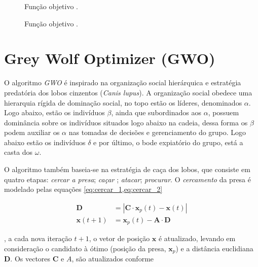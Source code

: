 \documentclass[a4paper, 11pt]{article}
\begin{document}
\begin{figure}[!ht]
    \centering
    \caption{Função objetivo .}
    \label{fig:statistic_sixhump}
    \subfloat[Dispersão.]{%
        \scalebox{.8}{}
    }
    \subfloat[Convergência.]{%
        \scalebox{.8}{}
    }
\end{figure}

\begin{figure}[!ht]
    \centering
    \caption{Função objetivo .}
    \label{fig:statistic_regularized_ts}
    \subfloat[Dispersão]{%
        \scalebox{.8}{}
    }
    \subfloat[Convergência]{%
        \scalebox{.8}{}
    }
\end{figure}

\section{Grey Wolf Optimizer (GWO)}

O algoritmo \textit{GWO} \cite{Mirjalili2014} é inspirado na organização social hierárquica e estratégia predatória dos lobos cinzentos (\textit{Canis lupus}). A organização social obedece uma hierarquia rígida de dominação social, no topo estão os líderes, denominados \( \alpha \). Logo abaixo, estão os indivíduos \( \beta \), ainda que subordinados aos \( \alpha \), possuem dominância sobre os indivíduos situados logo abaixo na cadeia, dessa forma os \( \beta \) podem auxiliar os \( \alpha \) nas tomadas de decisões e gerenciamento do grupo. Logo abaixo estão os indivíduos \( \delta \) e por último, o bode expiatório do grupo, está a casta dos \( \omega \). 

O algoritmo também baseia-se na estratégia de caça dos lobos, que consiste em quatro etapas: \textit{cercar a presa}; \textit{caçar} ; \textit{atacar}; \textit{procurar}. O \textit{cercamento} da presa é modelado pelas equações \ref{eq:cercar_1,eq:cercar_2}

\begin{align}
\label{eq:cercar_1}
\mathbf{D} &=\left|\mathbf{C} \cdot \mathbf{x}_p(t)-\mathbf{x}(t)\right| \\
\label{eq:cercar_2}
\mathbf{x}(t+1) &=\mathbf{x}_p(t)-\mathbf{A} \cdot \mathbf{D} 
\end{align}

, a cada nova iteração \( t+1\), o vetor de posição \( \mathbf{x} \) é atualizado, levando em consideração o candidato à ótimo (posição da presa, \( \mathbf{x}_p\)) e a distância euclidiana \( \mathbf{D}\). Os vectores \( \mathbf{C}\) e \( A\), são atualizados conforme
\end{document}
